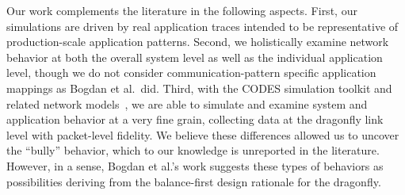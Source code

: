 Our work complements the literature in the following aspects. First, our simulations are driven by real application traces intended to be representative of production-scale application patterns. Second, we holistically examine network behavior at both the overall system level as well as the individual application level, though we do not consider communication-pattern specific application mappings as Bogdan et al.\ did. Third, with the CODES simulation toolkit and related network models~\cite{codes, codes-dragonfly},  
we are able to simulate and examine system and application behavior at a very fine grain, collecting data at the dragonfly link level with packet-level fidelity. We believe these differences allowed us to uncover the ``bully'' behavior, which to our knowledge is unreported in the literature. However, in a sense, Bogdan et al.'s work suggests these types of behaviors as possibilities deriving from the balance-first design rationale for the dragonfly.

